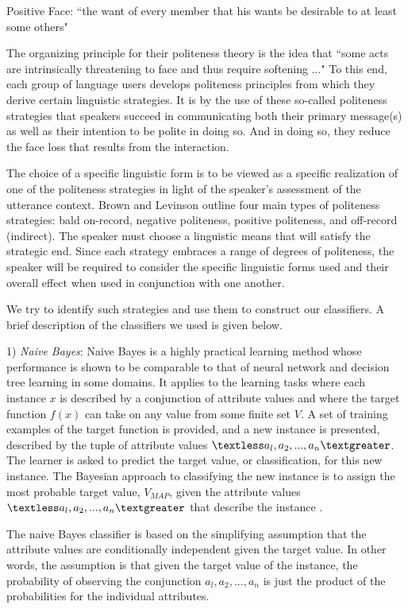 \documentclass[conference]{IEEEtran}
\begin{document}
Positive Face:
``the want of every member that his wants be desirable to at least some others"

The organizing principle for their politeness theory is the idea that ``some acts are intrinsically threatening to face and thus require softening ..." To this end, each group of language users develops politeness principles from which they derive certain linguistic strategies. It is by the use of these so-called politeness strategies that speakers succeed in communicating both their primary message(s) as well as their intention to be polite in doing so. And in doing so, they reduce the face loss that results from the interaction. 

The choice of a specific linguistic form is to be viewed as a specific realization of one of the politeness strategies in light of the speaker's assessment of the utterance context. Brown and Levinson outline four main types of politeness strategies: bald on-record, negative politeness, positive politeness, and off-record (indirect). The speaker must choose a linguistic means that will satisfy the strategic end. Since each strategy embraces a range of degrees of politeness, the speaker will be required to consider the specific linguistic forms used and their overall effect when used in conjunction with one another.

We try to identify such strategies and use them to construct our classifiers. A brief description of the classifiers we used is given below.

1) \textit{Naive Bayes}: Naive Bayes is a highly practical learning method whose performance is shown to be comparable to that of neural network and decision tree learning in some domains. It applies to the learning tasks where each instance $x$ is described by a conjunction of attribute values and where the target function $f(x)$ can take on any value from some finite set $V$. A set of training examples of the target function is provided, and a new instance is presented, described by the tuple of attribute values $\textless a_l, a_2,..., a_n\textgreater$. The learner is asked to predict the target value, or classification, for this new instance. The Bayesian approach to classifying the new instance is to assign the most probable target value, $V_{MAP}$, given the attribute values $\textless a_l, a_2,..., a_n\textgreater$ that describe the instance \cite{Mitchell}. 

The naive Bayes classifier is based on the simplifying assumption that the attribute values are conditionally independent given the target value. In other words, the assumption is that given the target value of the instance, the probability of observing the conjunction $a_l, a_2,..., a_n$ is just the product of the probabilities for the individual attributes.
\end{document}
